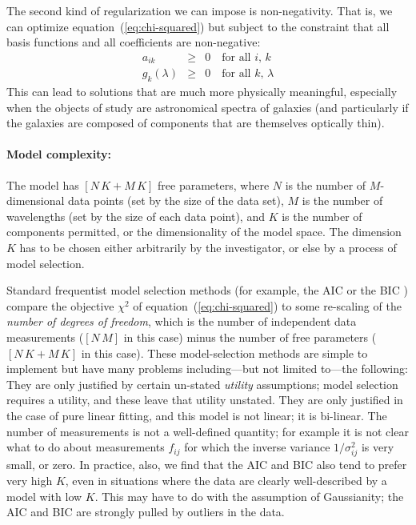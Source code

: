 \documentclass[12pt,preprint]{aastex}
\newcommand{\equationname}{equation}
\begin{document}
The second kind of regularization we can impose is non-negativity.
That is, we can optimize \equationname~(\ref{eq:chi-squared}) but subject
to the constraint that all basis functions and all coefficients are
non-negative:
\begin{eqnarray}\label{eq:non-negative}\displaystyle
a_{ik} & \geq & 0 \quad\mbox{for all $i$, $k$} \nonumber\\
g_{k}(\lambda) & \geq & 0 \quad\mbox{for all $k$, $\lambda$}
\end{eqnarray}
This can lead to solutions that are much more physically meaningful,
especially when the objects of study are astronomical spectra of
galaxies (and particularly if the galaxies are composed of components
that are themselves optically thin).

\paragraph{Model complexity:}
The model has $[N\,K + M\,K]$ free parameters, where $N$ is the number
of $M$-dimensional data points (set by the size of the data set), $M$
is the number of wavelengths (set by the size of each data point), and
$K$ is the number of components permitted, or the dimensionality of
the model space.  The dimension $K$ has to be chosen either
arbitrarily by the investigator, or else by a process of model
selection.

Standard frequentist model selection methods (for example, the AIC
\citep{aic} or the BIC \citep{bic}) 
compare the objective $\chi^2$ of
\equationname~(\ref{eq:chi-squared}) to some re-scaling of the
\emph{number of degrees of freedom}, which is the number of independent
data measurements ($[N\,M]$ in this case) minus the number of free
parameters ($[N\,K + M\,K]$ in this case).  These model-selection
methods are simple to implement but have many problems
including---but not limited to---the following: They are only
justified by certain un-stated \emph{utility} assumptions; model
selection requires a utility, and these leave that utility unstated.
They are only justified in the case of pure linear fitting, and this
model is not linear; it is bi-linear.  The number of measurements is
not a well-defined quantity; for example it is not clear what to do
about measurements $f_{ij}$ for which the inverse variance
$1/\sigma^2_{ij}$ is very small, or zero.  In practice, also, we find
that the AIC and BIC also tend to prefer very high $K$, even in
situations where the data are clearly well-described by a model with
low $K$.  This may have to do with the assumption of Gaussianity; the
AIC and BIC are strongly pulled by outliers in the data.
\end{document}
